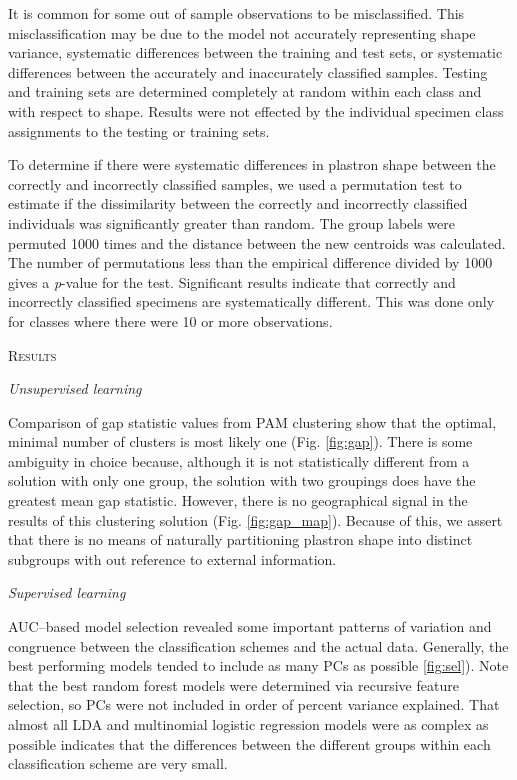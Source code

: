 \documentclass[12pt,letterpaper]{article}
\renewcommand{\section}[1]{%
\bigskip
\begin{center}
\begin{Large}
\normalfont\scshape #1
\medskip
\end{Large}
\end{center}}
\renewcommand{\subsection}[1]{%
\bigskip
\begin{center}
\begin{large}
\normalfont\itshape #1
\end{large}
\end{center}}
\begin{document}
It is common for some out of sample observations to be misclassified. This misclassification may be due to the model not accurately representing shape variance, systematic differences between the training and test sets, or systematic differences between the accurately and inaccurately classified samples. Testing and training sets are determined completely at random within each class and with respect to shape. Results were not effected by the individual specimen class assignments to the testing or training sets.

To determine if there were systematic differences in plastron shape between the correctly and incorrectly classified samples, we used a permutation test to estimate if the dissimilarity between the correctly and incorrectly classified individuals was significantly greater than random. The group labels were permuted 1000 times and the distance between the new centroids was calculated. The number of permutations less than the empirical difference divided by 1000 gives a \textit{p}-value for the test. Significant results indicate that correctly and incorrectly classified specimens are systematically different. This was done only for classes where there were 10 or more observations.



\section{Results}

\subsection{Unsupervised learning}
Comparison of gap statistic values from PAM clustering show that the optimal, minimal number of clusters is most likely one (Fig. \ref{fig:gap}). There is some ambiguity in choice because, although it is not statistically different from a solution with only one group, the solution with two groupings does have the greatest mean gap statistic. However, there is no geographical signal in the results of this clustering solution (Fig. \ref{fig:gap_map}). Because of this, we assert that there is no means of naturally partitioning plastron shape into distinct subgroups with out reference to external information.

\subsection{Supervised learning}
AUC--based model selection revealed some important patterns of variation and congruence between the classification schemes and the actual data. Generally, the best performing models tended to include as many PCs as possible \ref{fig:sel}). Note that the best random forest models were determined via recursive feature selection, so PCs were not included in order of percent variance explained. That almost all LDA and multinomial logistic regression models were as complex as possible indicates that the differences between the different groups within each classification scheme are very small.
\end{document}
